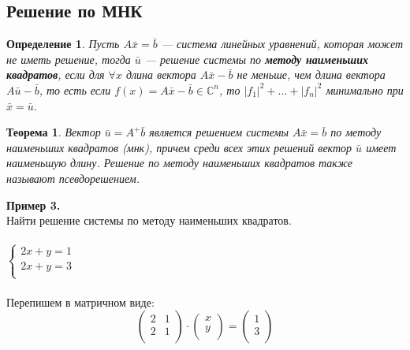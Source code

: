 \documentclass[12pt]{article}
\newtheorem*{definition}{Определение}
\newtheorem*{theorem}{Теорема}
\begin{document}
	\subsection{Решение по МНК}
	\begin{definition}
			Пусть $A\bar x = \bar b$ --- система линейных уравнений, которая может не иметь решение, тогда $\bar u$ --- решение системы по \textbf{методу наименьших квадратов}, если для $\forall x$ длина вектора $A\bar x - \bar b$ не меньше, чем длина вектора $A\bar u - \bar b$, то есть если $f(x)=A\bar x - \bar b \in \mathbb{C}^n$, то $|f_1|^2+...+|f_n|^2$ минимально при $\bar x = \bar u$.
	\end{definition}
	\begin{theorem}
		Вектор $\bar u = A^+ \bar b$ является решением системы $A\bar x = \bar b$ по методу наименьших квадратов (мнк), причем среди всех этих решений вектор $\bar u$ имеет наименьшую длину. Решение по методу наименьших квадратов также называют псевдорешением.
	\end{theorem}
	\textbf{Пример 3.}\\ 
	Найти решение системы по методу наименьших квадратов.\\ \\
	$
	\left\{  
	\begin{array}{ccl}  
	2x+y=1\\
	2x+y=3\\
	\end{array}   
	\right.  
	$
	\\ 
	\\Перепишем в матричном виде:\\
	\[\begin{pmatrix}
	2 & 1 \\         
	2 & 1 \\
	\end{pmatrix} \cdot \begin{pmatrix}
	x \\         
	y \\
	\end{pmatrix} = \begin{pmatrix}
	1 \\         
	3 \\
	\end{pmatrix}\]\\
\end{document}
